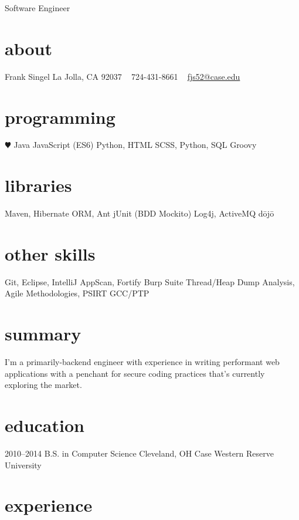 \documentclass[]{friggeri-cv}
\begin{document}
       {Software Engineer}


\begin{aside}
  \section{about}
    Frank Singel
    La Jolla, CA
    92037
    ~
    724-431-8661
    ~
    \href{mailto:fjs52@case.edu}{fjs52@case.edu}
  \section{programming}
    {\color{red} $\varheartsuit$} Java
    JavaScript
    (ES6)
    Python, HTML
    SCSS, Python, SQL
    Groovy
  \section{libraries}
    Maven, 
    Hibernate ORM, Ant
    jUnit (BDD Mockito)
    Log4j, ActiveMQ
    d\={o}j\={o}
  \section{other skills}
    Git, Eclipse, IntelliJ
    AppScan, Fortify
    Burp Suite
    Thread/Heap Dump Analysis,
    Agile Methodologies, PSIRT
    GCC/PTP
    
\end{aside}

\section{summary}
I'm a primarily-backend engineer with experience in writing performant web applications with a penchant for secure coding practices that's currently exploring the market.

\section{education}

\begin{entrylist}
  \entry
    {2010–2014}
    {B.S. in Computer Science}
    {Cleveland, OH}
    {Case Western Reserve University}
\end{entrylist}

\section{experience}
\end{document}
